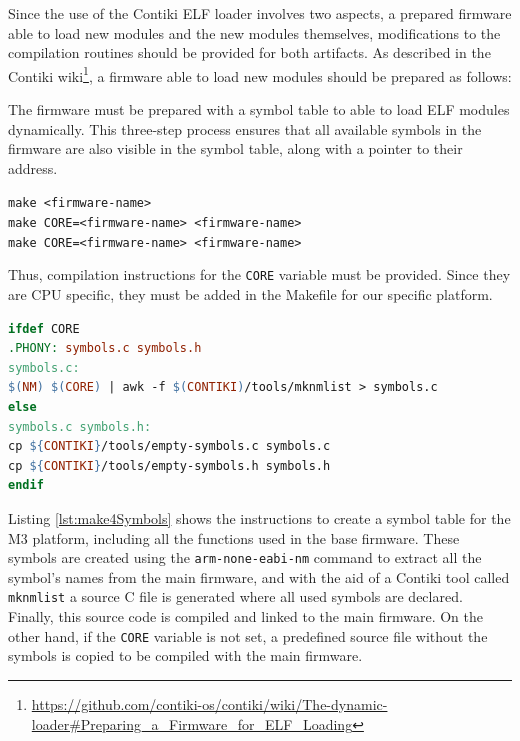 Since the use of the Contiki ELF loader involves two aspects, a prepared firmware able to load new modules and the new modules themselves, modifications to the compilation routines should be provided for both artifacts.
As described in the Contiki wiki\footnote{\url{https://github.com/contiki-os/contiki/wiki/The-dynamic-loader\#Preparing_a_Firmware_for_ELF_Loading}}, a firmware able to load new modules should be prepared as follows:
\begin{citeverbatim}
	The firmware must be prepared with a symbol table to able to load ELF modules dynamically.
	This three-step process ensures that all available symbols in the firmware are also visible in the symbol table, along with a pointer to their address.
	
	\texttt{make <firmware-name>} \\
	\texttt{make CORE=<firmware-name> <firmware-name>} \\
	\texttt{make CORE=<firmware-name> <firmware-name>} \\
\end{citeverbatim}
Thus, compilation instructions for the \texttt{CORE} variable must be provided.
Since they are CPU specific, they must be added in the Makefile for our specific platform.
\\
\begin{lstlisting}[language=make, caption=Compilation settings to create a proper symbol table, label=lst:make4Symbols]
ifdef CORE
.PHONY: symbols.c symbols.h
symbols.c:
$(NM) $(CORE) | awk -f $(CONTIKI)/tools/mknmlist > symbols.c
else
symbols.c symbols.h:
cp ${CONTIKI}/tools/empty-symbols.c symbols.c
cp ${CONTIKI}/tools/empty-symbols.h symbols.h
endif
\end{lstlisting}

Listing \ref{lst:make4Symbols} shows the instructions to create a symbol table for the M3 platform, including all the functions used in the base firmware.
These symbols are created using the \texttt{arm-none-eabi-nm} command to extract all the symbol's names from the main firmware, and with the aid of a Contiki tool called \texttt{mknmlist} a source C file is generated where all used symbols are declared.
Finally, this source code is compiled and linked to the main firmware.
On the other hand, if the \texttt{CORE} variable is not set, a predefined source file without the symbols is copied to be compiled with the main firmware.

